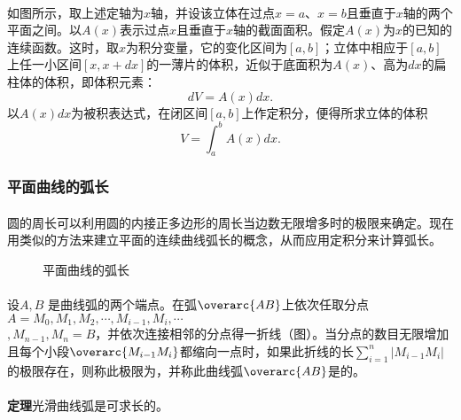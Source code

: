 \paragraph{}
如图所示，取上述定轴为$x$轴，并设该立体在过点$x=a$、$x=b$且垂直于$x$轴的两个平面之间。以$A(x)$表示过点$x$且垂直于$x$轴的截面面积。假定$A(x)$为$x$的已知的连续函数。这时，取$x$为积分变量，它的变化区间为$[a,b]$；立体中相应于$[a,b]$上任一小区间$[x,x+dx]$的一薄片的体积，近似于底面积为$A(x)$、高为$dx$的扁柱体的体积，即体积元素：
\begin{equation}
  dV = A(x)dx.
\end{equation}
以$A(x)dx$为被积表达式，在闭区间$[a,b]$上作定积分，便得所求立体的体积
\begin{equation}
  V = \int_a^bA(x)dx.
\end{equation}

\subsubsection{平面曲线的弧长}
\paragraph{}
圆的周长可以利用圆的内接正多边形的周长当边数无限增多时的极限来确定。现在用类似的方法来建立平面的连续曲线弧长的概念，从而应用定积分来计算弧长。

\begin{figure}[H]
\centering
  
  \caption{平面曲线的弧长}
  \label{平面曲线的弧长}
\end{figure}

\paragraph{}
设$A, B$ 是曲线弧的两个端点。在弧$\overarc{AB}$上依次任取分点$A=M_0,M_1,M_2,\cdots,M_{i-1},M_i,\cdots$\\$,M_{n-1},M_n=B$，并依次连接相邻的分点得一折线（图）。当分点的数目无限增加且每个小段$\overarc{M_{i-1}M_i}$都缩向一点时，如果此折线的长$\displaystyle\sum_{i=1}^n|M_{i-1}M_i|$的极限存在，则称此极限为，并称此曲线弧$\overarc{AB}$是的。

\paragraph{}
\textbf{定理\;}光滑曲线弧是可求长的。

